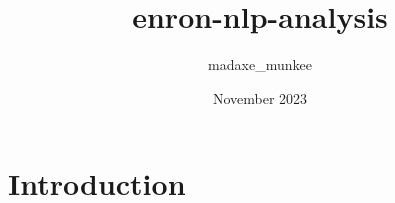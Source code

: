 \documentclass{article}
\title{enron-nlp-analysis}
\author{madaxe_munkee }
\date{November 2023}
\begin{document}
\maketitle

\section{Introduction}
\end{document}
